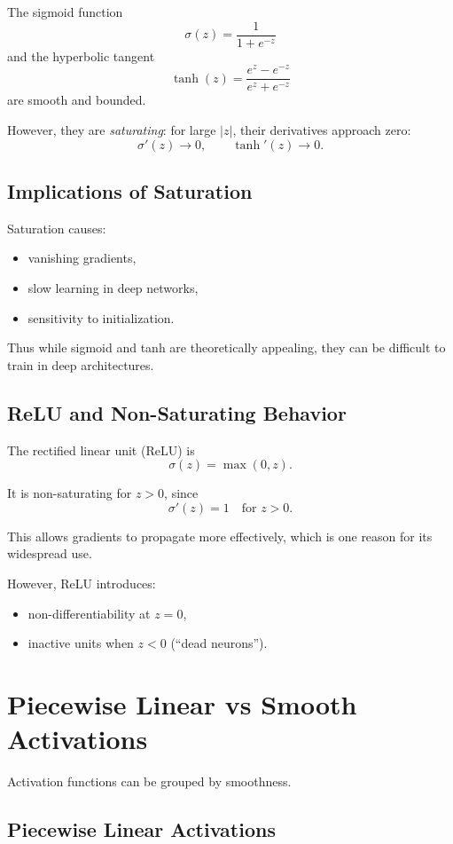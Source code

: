 The sigmoid function
\[
\sigma(z)=\frac{1}{1+e^{-z}}
\]
and the hyperbolic tangent
\[
\tanh(z)=\frac{e^z-e^{-z}}{e^z+e^{-z}}
\]
are smooth and bounded.

However, they are \emph{saturating}: for large $|z|$, their derivatives approach zero:
\[
\sigma'(z)\to 0,\qquad \tanh'(z)\to 0.
\]

\subsection{Implications of Saturation}

Saturation causes:
\begin{itemize}
    \item vanishing gradients,
    \item slow learning in deep networks,
    \item sensitivity to initialization.
\end{itemize}

Thus while sigmoid and tanh are theoretically appealing, they can be difficult to train in deep architectures.

\subsection{ReLU and Non-Saturating Behavior}

The rectified linear unit (ReLU) is
\[
\sigma(z)=\max(0,z).
\]

It is non-saturating for $z>0$, since
\[
\sigma'(z)=1 \quad \text{for } z>0.
\]

This allows gradients to propagate more effectively, which is one reason for its widespread use.

However, ReLU introduces:
\begin{itemize}
    \item non-differentiability at $z=0$,
    \item inactive units when $z<0$ (``dead neurons'').
\end{itemize}

\section{Piecewise Linear vs Smooth Activations}

Activation functions can be grouped by smoothness.

\subsection{Piecewise Linear Activations}

